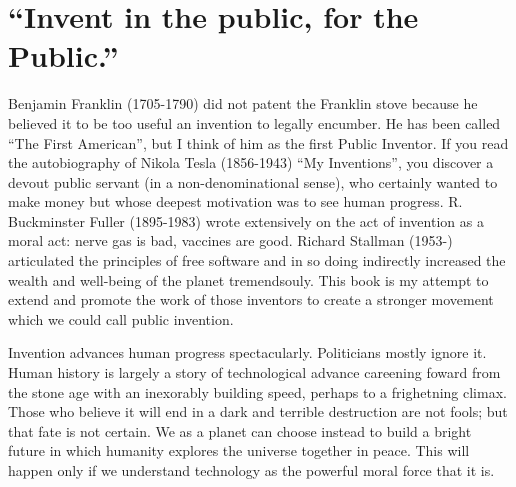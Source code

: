\documentclass[
	fontsize=10pt, %
	twoside=false, %
	secnumdepth=1, %
]{kaobook}
\begin{document}
\listoftables %

\endgroup


\mainmatter %


\chapter{“Invent in the public, for the Public.”}


Benjamin Franklin (1705-1790) did not patent the Franklin stove because
he believed it to be too useful an invention to legally encumber.
He has been
called ``The First American''\cite{Brands2000}, but I think of him as the
first Public Inventor.
If you read the autobiography of Nikola Tesla (1856-1943)
``My Inventions''\cite{Tesla1982},
you discover a devout public servant
(in a non-denominational sense), who certainly wanted to make
money but whose deepest motivation was to see human progress.
R. Buckminster Fuller (1895-1983) wrote extensively on the act of invention
as a moral act: nerve gas is bad, vaccines are good\cite{Fuller1981}.
Richard Stallman (1953-) articulated the principles of free software
and in so doing indirectly increased the wealth and well-being
of the planet tremendsouly\cite{Stallman2002free}.
This book is my attempt to extend and promote the work of
those inventors to create a stronger movement which we could
call public invention.

\nocite{laurel2001}
\nocite{jonassalk}

Invention advances human progress spectacularly.
Politicians mostly ignore it.
Human history is largely a story of technological
advance careening foward from the stone age with
an inexorably building speed,
perhaps to a frighetning climax.
Those who believe it will end in a dark and terrible
destruction are not fools;
but that fate is not certain.
We as a planet can choose instead to build a bright future
in which humanity explores the universe together in peace.
This will happen only if we understand technology as the
powerful moral force that it is.
\end{document}
